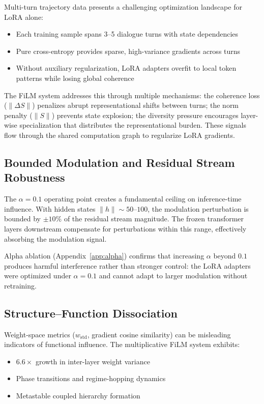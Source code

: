 \documentclass[11pt,a4paper]{article}
\begin{document}
Multi-turn trajectory data presents a challenging optimization landscape for
LoRA alone:
\begin{itemize}
  \item Each training sample spans 3--5 dialogue turns with state dependencies
  \item Pure cross-entropy provides sparse, high-variance gradients across turns
  \item Without auxiliary regularization, LoRA adapters overfit to local token
    patterns while losing global coherence
\end{itemize}

The FiLM system addresses this through multiple mechanisms: the coherence loss
($\|\Delta S\|$) penalizes abrupt representational shifts between turns; the norm
penalty ($\|S\|$) prevents state explosion; the diversity pressure encourages
layer-wise specialization that distributes the representational burden. These
signals flow through the shared computation graph to regularize LoRA gradients.

\subsection{Bounded Modulation and Residual Stream Robustness}

The $\alpha = 0.1$ operating point creates a fundamental ceiling on inference-time
influence. With hidden states $\|h\| \sim 50$--$100$, the modulation perturbation
is bounded by $\pm 10\%$ of the residual stream magnitude. The frozen transformer
layers downstream compensate for perturbations within this range, effectively
absorbing the modulation signal.

Alpha ablation (Appendix~\ref{app:alpha}) confirms that increasing $\alpha$ beyond
$0.1$ produces harmful interference rather than stronger control: the LoRA adapters
were optimized under $\alpha = 0.1$ and cannot adapt to larger modulation without
retraining.

\subsection{Structure--Function Dissociation}

Weight-space metrics ($w_\mathrm{std}$, gradient cosine similarity) can be
misleading indicators of functional influence. The multiplicative FiLM system
exhibits:
\begin{itemize}
  \item $6.6\times$ growth in inter-layer weight variance
  \item Phase transitions and regime-hopping dynamics
  \item Metastable coupled hierarchy formation
\end{itemize}
\end{document}
